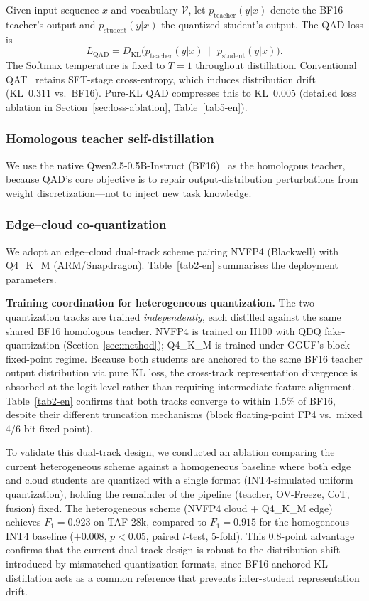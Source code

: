 \documentclass[final,5p,times,number]{elsarticle}
\begin{document}
Given input sequence $x$ and vocabulary $\mathcal{V}$, let $p_{\text{teacher}}(y|x)$ denote the BF16 teacher's output and $p_{\text{student}}(y|x)$ the quantized student's output. The QAD loss is
\begin{equation}
\label{eq:kl-loss}
L_{\mathrm{QAD}} = D_{\mathrm{KL}}\!\bigl( p_{\text{teacher}}(y|x)\,\|\,p_{\text{student}}(y|x) \bigr).
\end{equation}
The Softmax temperature is fixed to $T = 1$ throughout distillation. Conventional QAT~\cite{24,25,26} retains SFT-stage cross-entropy, which induces distribution drift (KL~0.311 vs.\ BF16). Pure-KL QAD compresses this to KL~0.005 (detailed loss ablation in Section~\ref{sec:loss-ablation}, Table~\ref{tab5-en}).

\subsubsection{Homologous teacher self-distillation}

We use the native Qwen2.5-0.5B-Instruct (BF16)~\cite{27,28,29} as the homologous teacher, because QAD's core objective is to repair output-distribution perturbations from weight discretization---not to inject new task knowledge.

\subsubsection{Edge--cloud co-quantization}

We adopt an edge--cloud dual-track scheme pairing NVFP4 (Blackwell) with Q4\_K\_M (ARM/Snapdragon). Table~\ref{tab2-en} summarises the deployment parameters.

\noindent\textbf{Training coordination for heterogeneous quantization.} The two quantization tracks are trained \emph{independently}, each distilled against the same shared BF16 homologous teacher. NVFP4 is trained on H100 with QDQ fake-quantization (Section~\ref{sec:method}); Q4\_K\_M is trained under GGUF's block-fixed-point regime. Because both students are anchored to the same BF16 teacher output distribution via pure KL loss, the cross-track representation divergence is absorbed at the logit level rather than requiring intermediate feature alignment. Table~\ref{tab2-en} confirms that both tracks converge to within 1.5\% of BF16, despite their different truncation mechanisms (block floating-point FP4 vs.\ mixed 4/6-bit fixed-point).

To validate this dual-track design, we conducted an ablation comparing the current heterogeneous scheme against a homogeneous baseline where both edge and cloud students are quantized with a single format (INT4-simulated uniform quantization), holding the remainder of the pipeline (teacher, OV-Freeze, CoT, fusion) fixed. The heterogeneous scheme (NVFP4 cloud + Q4\_K\_M edge) achieves $F_1 = 0.923$ on TAF-28k, compared to $F_1 = 0.915$ for the homogeneous INT4 baseline ($+0.008$, $p < 0.05$, paired $t$-test, 5-fold). This 0.8-point advantage confirms that the current dual-track design is robust to the distribution shift introduced by mismatched quantization formats, since BF16-anchored KL distillation acts as a common reference that prevents inter-student representation drift.
\end{document}
